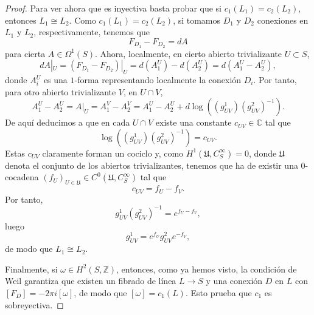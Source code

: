 \documentclass[12pt,a4paper]{article}
\theoremstyle{definition} \newtheorem{defn}[thm]{Definición}
\theoremstyle{definition} \newtheorem{ejemplo}[thm]{Ejemplo}
\theoremstyle{definition} \newtheorem{ejercicio}[thm]{Ejercicio}
\def\CC{\mathbb{C}}
\begin{document}
\begin{proof}
  Para ver ahora que es inyectiva basta probar que si $c_1(L_1)=c_2(L_2)$, entonces $L_1 \cong L_2$. Como $c_1(L_1)=c_2(L_2)$, si tomamos $D_1$ y $D_2$ conexiones en $L_1$ y $L_2$, respectivamente, tenemos que
  \begin{equation*}
    F_{D_1} - F_{D_2} = dA
  \end{equation*}
  para cierta $A\in \Omega^1(S)$. Ahora, localmente, en cierto abierto trivializante $U\subset S$,
  \begin{equation*}
    dA|_U = (F_{D_1} - F_{D_2}) |_U = d(A_1^U) - d(A_2^U)= d(A_1^U - A_2^U),
  \end{equation*}
  donde $A_i^U$ es una $1$-forma representando localmente la conexión $D_i$.
  Por tanto, para otro abierto trivializante $V$, en $U\cap V$,
  \begin{equation*}
    A_1^U - A_2^U = A|_U = A_1^V - A_2^V = A_1^U - A_2^U + d\log( (g_{UV}^1) (g_{UV}^2)^{-1}).
  \end{equation*}
  De aquí deducimos a que en cada $U\cap V$ existe una constante $c_{UV} \in \CC$ tal que 
  \begin{equation*}
    \log( (g_{UV}^1) (g_{UV}^2)^{-1}) = c_{UV}.
  \end{equation*}
  Estas $c_{UV}$ claramente forman un cociclo y, como $H^1(\mathfrak{U},C^\infty_S)=0$, donde $\mathfrak{U}$ denota el conjunto de los abiertos trivializantes, tenemos que ha de existir una $0$-cocadena $(f_U)_{U\in \mathfrak{U}} \in C^0(\mathfrak{U},C^\infty_S)$ tal que
  \begin{equation*}
    c_{UV} = f_U - f_V.
  \end{equation*}
  Por tanto,
  \begin{equation*}
    g_{UV}^1 (g_{UV}^2)^{-1} = e^{f_U-f_V},
  \end{equation*}
  luego
  \begin{equation*}
    g_{UV}^{1} = e^{f_U} g_{UV}^2 e^{-f_V},
  \end{equation*}
  de modo que $L_1 \cong L_2$.

  Finalmente, si $\omega \in H^2(S,\mathbb{Z})$, entonces, como ya hemos visto, la condición de Weil garantiza que existen un fibrado de línea $L\rightarrow S$ y una conexión $D$ en $L$ con $[F_D]=- 2\pi i [\omega]$, de modo que $[\omega]=c_1(L)$. Esto prueba que $c_1$ es sobreyectiva.
\end{proof}








  
\end{document}
